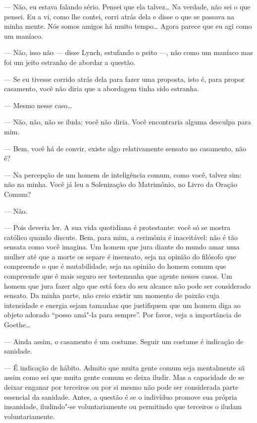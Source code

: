 --- Não, eu estava falando sério.  Pensei que ela talvez\ldots{}  Na
verdade, não sei o que pensei.  Eu a vi, como lhe contei, corri atrás
dela e disse o que se passava na minha mente.  Nós somos amigos há
muito tempo\ldots{}  Agora parece que eu agi como um maníaco.

--- Não, isso não --- disse Lynch, estufando o peito ---, não como
um maníaco mas foi um jeito estranho de abordar a questão.

--- Se eu tivesse corrido atrás dela para fazer uma proposta,
isto é, para propor casamento, você não diria que a abordagem tinha
sido estranha.

--- Mesmo nesse caso\ldots{}

--- Não, não, não se iluda; você não diria.  Você encontraria
alguma desculpa para mim.

--- Bem, você há de convir, existe algo relativamente sensato no
casamento, não é?

--- Na percepção de um homem de inteligência comum, como você,
talvez sim: não na minha.  Você já leu a Solenização do Matrimônio, no
Livro da Oração Comum?

--- Não.

--- Pois deveria ler.  A sua vida quotidiana é protestante: você
só se mostra católico quando discute.  Bem, para mim, a cerimônia é
inaceitável: não é tão sensata como você imagina.  Um homem que jura
diante do mundo amar uma mulher até que a morte os separe é insensato,
seja na opinião do filósofo que compreende o que é mutabilidade, seja
na opinião do homem comum que compreende que é mais seguro ser
testemunha que agente nesses casos.  Um homem que jura fazer algo que
está fora do seu alcance não pode ser considerado sensato.  Da minha
parte, não creio existir um momento de paixão cuja intensidade e
energia sejam tamanhas que justifiquem que um homem diga ao objeto
adorado “posso amá"-la para sempre”.  Por favor, veja a importância de
Goethe\ldots{}

--- Ainda assim, o casamento é um costume.  Seguir um costume é
indicação de sanidade.

--- É indicação de hábito.  Admito que muita gente comum seja
mentalmente sã assim como sei que muita gente comum se deixa iludir. 
Mas a capacidade de se deixar enganar por terceiros ou por si mesmo não
pode ser considerada parte essencial da sanidade.  Antes, a questão é
se o indivíduo promove sua própria insanidade, iludindo"-se
voluntariamente ou permitindo que terceiros o iludam voluntariamente.

